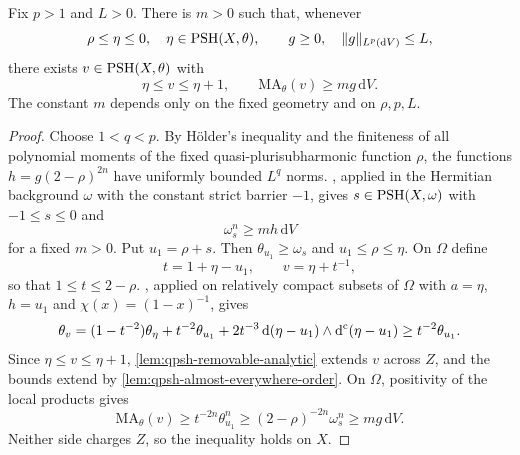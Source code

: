 \begin{lemma}\label{lem:big-reference-subsolution}
Fix $p>1$ and $L>0$. There is $m>0$ such that, whenever
\[
 \rho\leq\eta\leq0,\quad\eta\in\mathrm{PSH}(X,\theta),
 \qquad g\geq0,\quad\|g\|_{L^p(\mathrm{d}V)}\leq L,
\]
there exists $v\in\mathrm{PSH}(X,\theta)$ with
\[
 \eta\leq v\leq\eta+1,\qquad
 \mathrm{MA}_\theta(v)\geq m g\,\mathrm{d}V.
\]
The constant $m$ depends only on the fixed geometry and on $\rho,p,L$.
\end{lemma}
\begin{proof}
Choose $1<q<p$. By H\"older's inequality and the finiteness of all polynomial moments of the fixed quasi-plurisubharmonic function $\rho$, the functions $h=g(2-\rho)^{2n}$ have uniformly bounded $L^q$ norms. , applied in the Hermitian background $\omega$ with the constant strict barrier $-1$, gives $s\in\mathrm{PSH}(X,\omega)$ with $-1\leq s\leq0$ and
\[
 \omega_s^n\geq m h\,\mathrm{d}V
\]
for a fixed $m>0$. Put $u_1=\rho+s$. Then $\theta_{u_1}\geq\omega_s$ and $u_1\leq\rho\leq\eta$. On $\Omega$ define
\[
 t=1+\eta-u_1,\qquad v=\eta+t^{-1},
\]
so that $1\leq t\leq2-\rho$. , applied on relatively compact subsets of $\Omega$ with $a=\eta$, $h=u_1$ and $\chi(x)=(1-x)^{-1}$, gives
\[
 \theta_v=(1-t^{-2})\theta_\eta+t^{-2}\theta_{u_1}
       +2t^{-3}\,\mathrm{d}(\eta-u_1)\wedge\mathrm d^{\mathrm c}(\eta-u_1)
 \geq t^{-2}\theta_{u_1}.
\]
Since $\eta\leq v\leq\eta+1$, \cref{lem:qpsh-removable-analytic} extends $v$ across $Z$, and the bounds extend by \cref{lem:qpsh-almost-everywhere-order}. On $\Omega$, positivity of the local products gives
\[
 \mathrm{MA}_\theta(v)\geq t^{-2n}\theta_{u_1}^n
       \geq(2-\rho)^{-2n}\omega_s^n
       \geq m g\,\mathrm{d}V.
\]
Neither side charges $Z$, so the inequality holds on $X$.
\end{proof}

